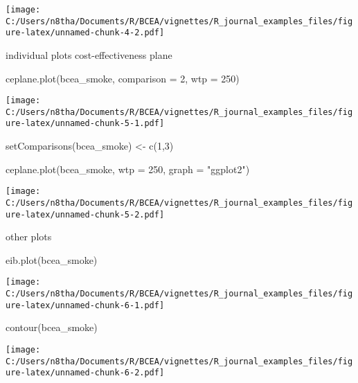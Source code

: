 \documentclass[
]{article}
\newenvironment{Shaded}{\begin{snugshade}}{\end{snugshade}}
\newcommand{\AttributeTok}[1]{\textcolor[rgb]{0.77,0.63,0.00}{#1}}
\newcommand{\DecValTok}[1]{\textcolor[rgb]{0.00,0.00,0.81}{#1}}
\newcommand{\FunctionTok}[1]{\textcolor[rgb]{0.00,0.00,0.00}{#1}}
\newcommand{\NormalTok}[1]{#1}
\newcommand{\OtherTok}[1]{\textcolor[rgb]{0.56,0.35,0.01}{#1}}
\newcommand{\StringTok}[1]{\textcolor[rgb]{0.31,0.60,0.02}{#1}}
\begin{document}
\texttt{[image: C:/Users/n8tha/Documents/R/BCEA/vignettes/R\_journal\_examples\_files/figure-latex/unnamed-chunk-4-2.pdf]}

individual plots cost-effectiveness plane

\begin{Shaded}
\begin{Highlighting}[]
\FunctionTok{ceplane.plot}\NormalTok{(bcea\_smoke, }\AttributeTok{comparison =} \DecValTok{2}\NormalTok{, }\AttributeTok{wtp =} \DecValTok{250}\NormalTok{)}
\end{Highlighting}
\end{Shaded}

\texttt{[image: C:/Users/n8tha/Documents/R/BCEA/vignettes/R\_journal\_examples\_files/figure-latex/unnamed-chunk-5-1.pdf]}

\begin{Shaded}
\begin{Highlighting}[]

\FunctionTok{setComparisons}\NormalTok{(bcea\_smoke) }\OtherTok{\textless{}{-}} \FunctionTok{c}\NormalTok{(}\DecValTok{1}\NormalTok{,}\DecValTok{3}\NormalTok{)}

\FunctionTok{ceplane.plot}\NormalTok{(bcea\_smoke, }\AttributeTok{wtp =} \DecValTok{250}\NormalTok{, }\AttributeTok{graph =} \StringTok{"ggplot2"}\NormalTok{)}
\end{Highlighting}
\end{Shaded}

\texttt{[image: C:/Users/n8tha/Documents/R/BCEA/vignettes/R\_journal\_examples\_files/figure-latex/unnamed-chunk-5-2.pdf]}

other plots

\begin{Shaded}
\begin{Highlighting}[]
\FunctionTok{eib.plot}\NormalTok{(bcea\_smoke)}
\end{Highlighting}
\end{Shaded}

\texttt{[image: C:/Users/n8tha/Documents/R/BCEA/vignettes/R\_journal\_examples\_files/figure-latex/unnamed-chunk-6-1.pdf]}

\begin{Shaded}
\begin{Highlighting}[]

\FunctionTok{contour}\NormalTok{(bcea\_smoke)}
\end{Highlighting}
\end{Shaded}

\texttt{[image: C:/Users/n8tha/Documents/R/BCEA/vignettes/R\_journal\_examples\_files/figure-latex/unnamed-chunk-6-2.pdf]}
\end{document}
